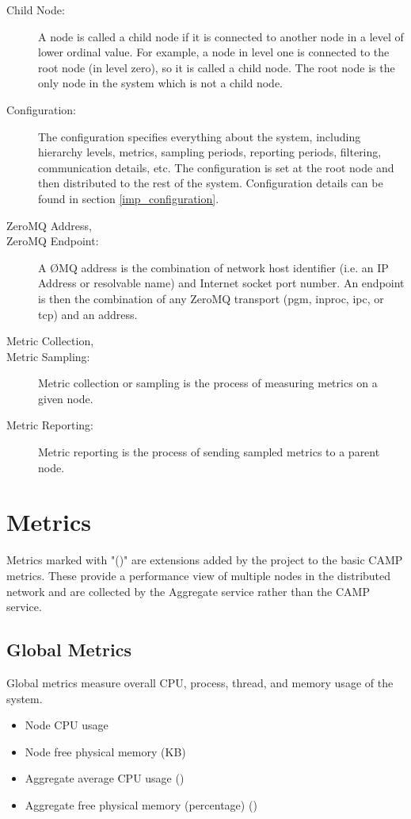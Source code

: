 \begin{description}
\item[Child Node:]
A node is called a child node if it is connected to another node in a level of lower ordinal value. For example, a node
in level one is connected to the root node (in level zero), so it is called a child node. The root node is the only
node in the \dcamp system which is not a child node. 

\item[\dcamp Configuration:]
The \dcamp configuration specifies everything about the system, including hierarchy levels, metrics, sampling periods,
reporting periods, filtering, communication details, etc. The configuration is set at the root node and then
distributed to the rest of the \dcamp system. Configuration details can be found in section \ref{imp_configuration}. 

\item[ZeroMQ Address,]
\item[ZeroMQ Endpoint:]
A \O MQ address is the combination of network host identifier (i.e. an IP Address or resolvable name) and Internet
socket port number. An endpoint is then the combination of any ZeroMQ transport (pgm, inproc, ipc, or tcp) and an
address.

\item[Metric Collection,]
\item[Metric Sampling:]
Metric collection or sampling is the process of measuring metrics on a given node. 

\item[Metric Reporting:]
Metric reporting is the process of sending sampled metrics to a parent node.

\end{description}

\section{\dcamp Metrics}
\label{dcamp_metrics}
Metrics marked with "(\dcamp)" are extensions added by the \dcamp project to the basic CAMP metrics. These provide a
performance view of multiple nodes in the distributed network and are collected by the Aggregate service rather than the
CAMP service.

\subsection{Global Metrics}
Global metrics measure overall CPU, process, thread, and memory usage of the system.
\begin{itemize}
\item Node CPU usage 
\item Node free physical memory (KB) 
\item Aggregate average CPU usage (\dcamp) 
\item Aggregate free physical memory (percentage) (\dcamp)
\end{itemize}

